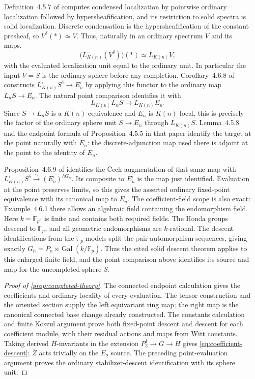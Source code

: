\documentclass[11pt]{article}
\numberwithin{equation}{section}
\theoremstyle{definition}
\theoremstyle{remark}
\begin{document}
Definition~4.5.7 of \cite{BMR2026} computes condensed localization by
pointwise ordinary localization followed by hypersheafification, and its
restriction to solid spectra is solid localization. Discrete condensation
is the hypersheafification of the constant presheaf, so
\(V^\delta(*)\simeq V\). Thus, naturally in an ordinary spectrum \(V\)
and its maps,
\[
 \bigl(L_{K(n)}^\square(V^\delta)\bigr)(*)\simeq L_{K(n)}V,
\]
with the evaluated localization unit equal to the ordinary unit.
In particular the input \(V=S\) is the ordinary sphere before any
completion. Corollary~4.6.8 of \cite{BMR2026} constructs
\(L_{K(n)}^\square S^\delta\to E_n^\square\) by applying this functor
to the ordinary map \(L_nS\to E_n\). The natural point comparison
identifies it with
\[
 L_{K(n)}L_nS\longrightarrow L_{K(n)}E_n.
\]
Since \(S\to L_nS\) is a \(K(n)\)-equivalence and \(E_n\) is
\(K(n)\)-local, this is precisely the factor of the ordinary sphere
unit \(S\to E_n\) through \(L_{K(n)}S\). Lemma~4.5.8 and the endpoint
formula of Proposition~4.5.5 in that paper identify the target at the
point naturally with \(E_n\): the discrete-adjunction map used there is
adjoint at the point to the identity of \(E_n\).

Proposition~4.6.9 of \cite{BMR2026} identifies the \v Cech augmentation
of that same map with
\(L_{K(n)}^\square S^\delta\xrightarrow{\sim}(E_n^\square)^{hG_n}\).
Its composite to \(E_n^\square\) is the map just identified. Evaluation
at the point preserves limits, so this gives the asserted ordinary
fixed-point equivalence with its canonical map to \(E_n\).
The coefficient-field scope is also exact: Example~4.6.1 there allows an
algebraic field containing the endomorphism field. Here
\(k=\mathbb F_{p^6}\) is finite and contains both required fields. The Honda
groups descend to \(\mathbb F_p\), and all geometric endomorphisms are
\(k\)-rational. The descent identifications from the \(\mathbb F_p\)-models split
the pair-automorphism sequences, giving exactly
\(G_n=P_n\rtimes\operatorname{Gal}(k/\mathbb F_p)\). Thus the cited solid descent theorem
applies to this enlarged finite field, and the point comparison above
identifies its source and map for the uncompleted sphere \(S\).

\begin{proof}[Proof of \cref{prop:completed-theory}]
The connected endpoint calculation gives the coefficients and ordinary
locality of every evaluation. The tensor construction and the oriented
section supply the left equivariant ring map; the right map is the
canonical connected base change already constructed.
The constants calculation and finite Koszul
argument prove both fixed-point descent and descent for each coefficient
module, with their residual actions and maps from Witt constants.
Taking derived \(H\)-invariants in the extension
\(P_3^1\to G\to H\) gives \eqref{eq:coefficient-descent};
\(\overline Z\) acts trivially on the \(E_2\) source.
The preceding point-evaluation argument proves the ordinary
stabilizer-descent identification with its sphere unit.
\end{proof}
\end{document}
